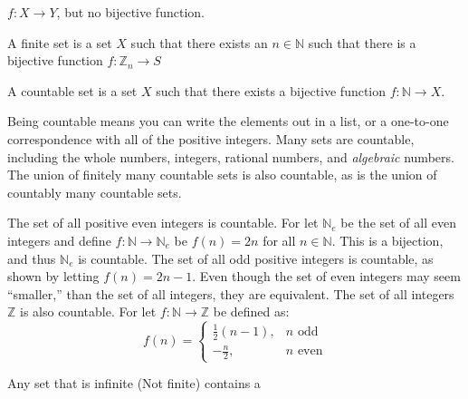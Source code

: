             $f:X\rightarrow{Y}$, but no bijective function.
            \begin{definition}
                A finite set is a set $X$ such that there
                exists an $n\in\mathbb{N}$ such that there is
                a bijective function
                $f:\mathbb{Z}_{n}\rightarrow{S}$
            \end{definition}
            \begin{definition}
                A countable set is a set
                $X$ such that there exists a bijective
                function $f:\mathbb{N}\rightarrow{X}$.
            \end{definition}
            Being countable means you can write
            the elements out in a list, or a
            one-to-one correspondence with all of
            the positive integers. Many sets are countable,
            including the whole numbers, integers, rational
            numbers, and \textit{algebraic} numbers. The
            union of finitely many countable sets is also
            countable, as is the union of countably many
            countable sets.
            \begin{example}
                The set of all positive even integers is
                countable. For let $\mathbb{N}_{e}$ be the
                set of all even integers and define
                $f:\mathbb{N}\rightarrow\mathbb{N}_{e}$ be
                $f(n)=2n$ for all $n\in\mathbb{N}$. This is
                a bijection, and thus $\mathbb{N}_{e}$ is
                countable. The set of all odd positive integers
                is countable, as shown by letting
                $f(n)=2n-1$. Even though the set of even
                integers may seem ``smaller,'' than the set of
                all integers, they are equivalent. The set of
                all integers $\mathbb{Z}$ is also countable.
                For let $f:\mathbb{N}\rightarrow\mathbb{Z}$
                be defined as:
                \begin{equation}
                    f(n)=
                    \begin{cases}
                        \frac{1}{2}(n-1),&n\textrm{ odd}\\
                        -\frac{n}{2},&n\textrm{ even}
                    \end{cases}
                \end{equation}
            \end{example}
            Any set that is infinite (Not finite) contains a
